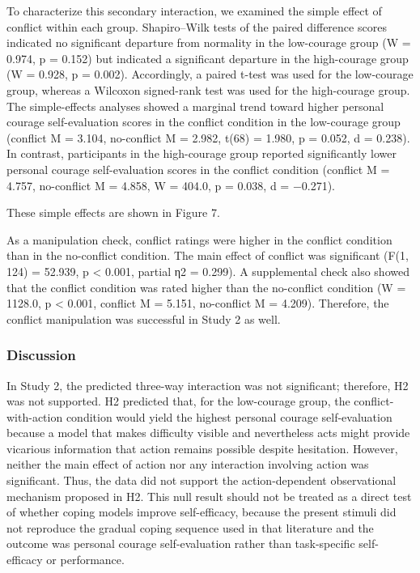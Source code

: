 \documentclass[
]{article}
\begin{document}
To characterize this secondary interaction, we examined the simple
effect of conflict within each group. Shapiro--Wilk tests of the paired
difference scores indicated no significant departure from normality in
the low-courage group (W = 0.974, p = 0.152) but indicated a significant
departure in the high-courage group (W = 0.928, p = 0.002). Accordingly,
a paired t-test was used for the low-courage group, whereas a Wilcoxon
signed-rank test was used for the high-courage group. The simple-effects
analyses showed a marginal trend toward higher personal courage
self-evaluation scores in the conflict condition in the low-courage
group (conflict M = 3.104, no-conflict M = 2.982, t(68) = 1.980, p =
0.052, d = 0.238). In contrast, participants in the high-courage group
reported significantly lower personal courage self-evaluation scores in
the conflict condition (conflict M = 4.757, no-conflict M = 4.858, W =
404.0, p = 0.038, d = −0.271).

These simple effects are shown in Figure 7.

As a manipulation check, conflict ratings were higher in the conflict
condition than in the no-conflict condition. The main effect of conflict
was significant (F(1, 124) = 52.939, p \textless{} 0.001, partial η2 =
0.299). A supplemental check also showed that the conflict condition was
rated higher than the no-conflict condition (W = 1128.0, p \textless{}
0.001, conflict M = 5.151, no-conflict M = 4.209). Therefore, the
conflict manipulation was successful in Study 2 as well.

\subsubsection{Discussion}\label{discussion-1}

In Study 2, the predicted three-way interaction was not significant;
therefore, H2 was not supported. H2 predicted that, for the low-courage
group, the conflict-with-action condition would yield the highest
personal courage self-evaluation because a model that makes difficulty
visible and nevertheless acts might provide vicarious information that
action remains possible despite hesitation. However, neither the main
effect of action nor any interaction involving action was significant.
Thus, the data did not support the action-dependent observational
mechanism proposed in H2. This null result should not be treated as a
direct test of whether coping models improve self-efficacy, because the
present stimuli did not reproduce the gradual coping sequence used in
that literature and the outcome was personal courage self-evaluation
rather than task-specific self-efficacy or performance.
\end{document}
